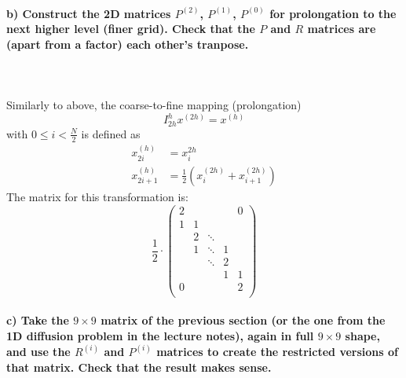 \paragraph{
    b) Construct the 2D matrices $P^{(2)}$, $P^{(1)}$, $P^{(0)}$
    for
    prolongation to the next higher level (finer grid). Check that
    the $P$ and $R$ matrices are (apart from a factor) each other’s
    tranpose.
} \ \\
    \\
    Similarly to above, the coarse-to-fine mapping (prolongation)
    \begin{equation}
        I_{2h}^h x^{(2h)}=x^{(h)}
    \end{equation}
    with $0\leq i<\frac{N}{2}$ is defined as
    \begin{align}
            x_{2i}^{(h)}
            &=x_i^{2h} \\
            x_{2i+1}^{(h)}
            &=\frac{1}{2}(x_i^{(2h)}+x_{i+1}^{(2h)})
    \end{align}
    The matrix for this transformation is:
    \begin{equation}
        \frac{1}{2}\cdot
        \begin{pmatrix}
            2      &   &        &   & 0 \\
            1      & 1 &        &   &        \\
                   & 2 & \ddots &   &        \\
                   & 1 & \ddots & 1 &        \\
                   &   & \ddots & 2 &        \\
                   &   &        & 1 & 1      \\
            0      &   &        &   & 2      \\

        \end{pmatrix}
    \end{equation}


\paragraph{
    c) Take the $9\times9$ matrix of the previous section (or the one
    from the 1D diffusion problem in the lecture notes), again in full
    $9\times9$ shape, and use the $R^{(i)}$ and $P^{(i)}$ matrices to
    create the restricted versions of that matrix.
    Check that the result makes sense.
} \ \\
    \\

